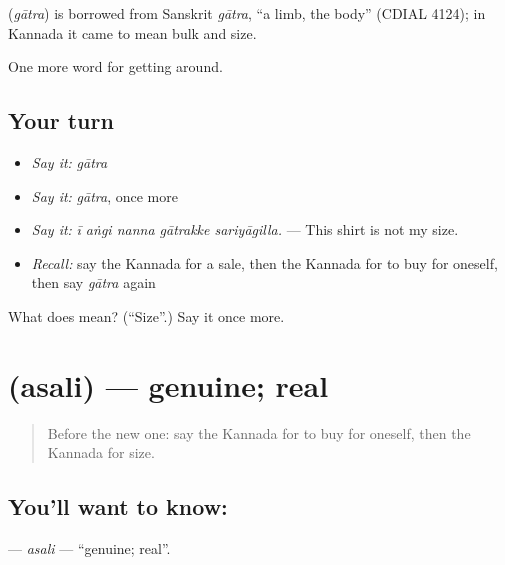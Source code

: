 \begin{cousinweb}
\textbf{} (\emph{gātra}) is borrowed from Sanskrit \emph{gātra}, \textquotedblleft{}a limb, the body\textquotedblright{} (CDIAL 4124); in Kannada it came to mean bulk and size.
\end{cousinweb}

\begin{grammarlens}[title={What you've built}]
One more word for getting around.
\end{grammarlens}

\subsection*{Your turn}
\begin{itemize}
\raggedright
  \item \emph{Say it:} \emph{gātra}
  \item \emph{Say it:} \emph{gātra}, once more
  \item \emph{Say it:} \emph{ī aṅgi nanna gātrakke sariyāgilla.} — This shirt is not my size.
  \item \emph{Recall:} say the Kannada for a sale, then the Kannada for to buy for oneself, then say \emph{gātra} again
\end{itemize}

\begin{tcolorbox}[breakable,colback=teal!4,colframe=teal!35!black,title={Before you move on}]
What does  mean? (\textquotedblleft{}Size\textquotedblright{}.) Say it once more.
\end{tcolorbox}
\section[\texorpdfstring{\kn{ಅಸಲಿ} (asali)}{ಅಸಲಿ (asali)}]{ (asali) — genuine; real}

\label{lesson:KA-C468-asali}



\begin{quote}
Before the new one: say the Kannada for to buy for oneself, then the Kannada for size.
\end{quote}

\subsection*{You'll want to know: }
\textbf{} — \emph{asali} — \textquotedblleft{}genuine; real\textquotedblright{}.

